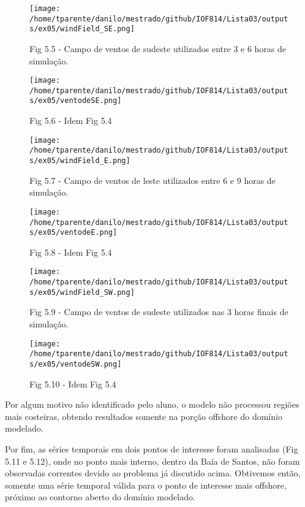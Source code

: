 \documentclass[11pt]{article}
\makeatletter
\def\maxwidth{\ifdim\Gin@nat@width>\linewidth\linewidth
    \else\Gin@nat@width\fi}
\let\Oldincludegraphics\includegraphics
\renewcommand{\includegraphics}[1]{\Oldincludegraphics[width=.8\maxwidth]{#1}}
\makeatother
\begin{document}
\begin{figure}[!ht]
\centering
\centerline{\hbox{\texttt{[image: /home/tparente/danilo/mestrado/github/IOF814/Lista03/outputs/ex05/windField\_SE.png]}}}
\caption{Fig 5.5 - Campo de ventos de sudeste utilizados entre 3 e 6 horas de simulação.}
\label{fig5:5}
\end{figure}

\begin{figure}[!ht]
\centering
\centerline{\hbox{\texttt{[image: /home/tparente/danilo/mestrado/github/IOF814/Lista03/outputs/ex05/ventodeSE.png]}}}
\caption{Fig 5.6 - Idem Fig 5.4}
\label{fig5:6}
\end{figure}

\begin{figure}[!ht]
\centering
\centerline{\hbox{\texttt{[image: /home/tparente/danilo/mestrado/github/IOF814/Lista03/outputs/ex05/windField\_E.png]}}}
\caption{Fig 5.7 - Campo de ventos de leste utilizados entre 6 e 9 horas de simulação.}
\label{fig5:7}
\end{figure}

\begin{figure}[!ht]
\centering
\centerline{\hbox{\texttt{[image: /home/tparente/danilo/mestrado/github/IOF814/Lista03/outputs/ex05/ventodeE.png]}}}
\caption{Fig 5.8 - Idem Fig 5.4}
\label{fig5:8}
\end{figure}

\begin{figure}[!ht]
\centering
\centerline{\hbox{\texttt{[image: /home/tparente/danilo/mestrado/github/IOF814/Lista03/outputs/ex05/windField\_SW.png]}}}
\caption{Fig 5.9 - Campo de ventos de sudeste utilizados nas 3 horas finais de simulação.}
\label{fig5:9}
\end{figure}

\begin{figure}[!ht]
\centering
\centerline{\hbox{\texttt{[image: /home/tparente/danilo/mestrado/github/IOF814/Lista03/outputs/ex05/ventodeSW.png]}}}
\caption{Fig 5.10 - Idem Fig 5.4}
\label{fig5:10}
\end{figure}

Por algum motivo não identificado pelo aluno, o modelo não processou
regiões mais costeiras, obtendo resultados somente na porção offshore do
domínio modelado.

Por fim, as séries temporais em dois pontos de interesse foram analisadas (Fig 5.11 e 5.12), onde no ponto
mais interno, dentro da Baía de Santos, não foram observadas correntes devido ao problema já discutido acima.
Obtivemos então, somente uma série temporal válida para o ponto de interesse mais offshore, próximo ao contorno
aberto do domínio modelado.
\end{document}
